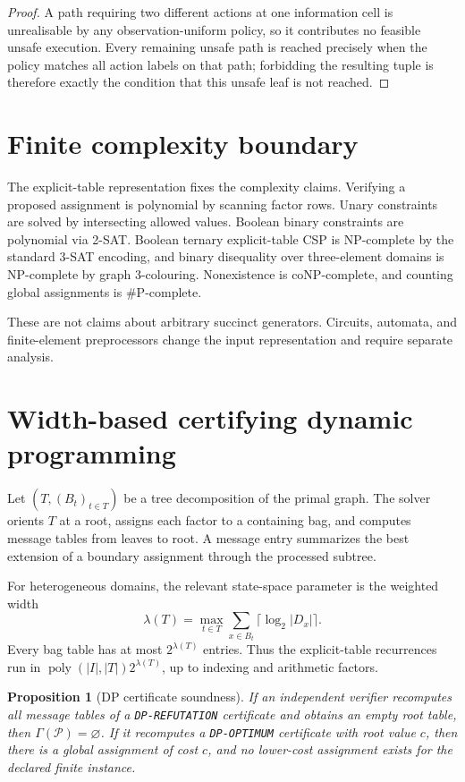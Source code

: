 \documentclass[11pt]{article}
\theoremstyle{plain}
\newtheorem{proposition}[theorem]{Proposition}
\theoremstyle{definition}
\theoremstyle{remark}
\begin{document}
\begin{proof}
A path requiring two different actions at one information cell is unrealisable
by any observation-uniform policy, so it contributes no feasible unsafe
execution.  Every remaining unsafe path is reached precisely when the policy
matches all action labels on that path; forbidding the resulting tuple is
therefore exactly the condition that this unsafe leaf is not reached.
\end{proof}

\section{Finite complexity boundary}
\label{sec:complexity}

The explicit-table representation fixes the complexity claims.  Verifying a
proposed assignment is polynomial by scanning factor rows.  Unary constraints
are solved by intersecting allowed values.  Boolean binary constraints are
polynomial via 2-SAT.  Boolean ternary explicit-table CSP is NP-complete by the
standard 3-SAT encoding, and binary disequality over three-element domains is
NP-complete by graph 3-colouring.  Nonexistence is coNP-complete, and counting
global assignments is \(\#\mathrm P\)-complete.

These are not claims about arbitrary succinct generators.  Circuits, automata,
and finite-element preprocessors change the input representation and require
separate analysis.

\section{Width-based certifying dynamic programming}
\label{sec:width-dp}

Let \((T,(B_t)_{t\in T})\) be a tree decomposition of the primal graph.  The
solver orients \(T\) at a root, assigns each factor to a containing bag, and
computes message tables from leaves to root.  A message entry summarizes the
best extension of a boundary assignment through the processed subtree.

For heterogeneous domains, the relevant state-space parameter is the weighted
width
\[
  \lambda(T)=\max_{t\in T}\sum_{x\in B_t}\lceil\log_2|D_x|\rceil.
\]
Every bag table has at most \(2^{\lambda(T)}\) entries.  Thus the explicit-table
recurrences run in \(\operatorname{poly}(|I|,|T|)2^{\lambda(T)}\), up to
indexing and arithmetic factors.

\begin{proposition}[DP certificate soundness]
If an independent verifier recomputes all message tables of a
\texttt{DP-REFUTATION} certificate and obtains an empty root table, then
\(\Gamma(\mathcal P)=\varnothing\).  If it recomputes a \texttt{DP-OPTIMUM}
certificate with root value \(c\), then there is a global assignment of cost
\(c\), and no lower-cost assignment exists for the declared finite instance.
\end{proposition}
\end{document}
